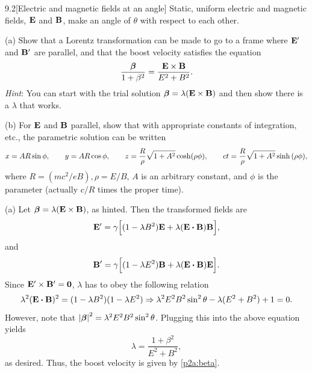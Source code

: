 \documentclass[12pt]{article}
\begin{document}
\begin{problem}{9.2}[Electric and magnetic fields at an angle]
Static, uniform electric and magnetic fields, $\vb{E}$ and $\vb{B}$, make an
angle of $\theta$ with respect to each other.

(a) Show that a Lorentz transformation can be made to go to a frame where
$\vb{E}'$ and $\vb{B}'$ are parallel, and that the boost velocity satisfies the
equation
\begin{equation}\label{p2a:beta}
    \frac{\bm\beta}{1+\beta^2}=\frac{\vb{E}\times\vb{B}}{E^2+B^2}. 
\end{equation}
\textit{Hint}: You can start with the trial solution
$\bm\beta=\lambda(\vb{E}\times\vb{B})$ and then show there is a $\lambda$ that
works.

(b) For $\vb{E}$ and $\vb{B}$ parallel, show that with appropriate constants of
integration, etc., the parametric solution can be written
\begin{equation}
    x=AR\sin\phi,\qquad
    y=AR\cos\phi,\qquad
    z=\frac{R}{\rho}\sqrt{1+A^2}\cosh(\rho\phi),\qquad
    ct=\frac{R}{\rho}\sqrt{1+A^2}\sinh\qty(\rho\phi),
\end{equation}
where $R=(mc^2/eB),\rho=E/B$, $A$ is an arbitrary constant, and $\phi$ is the
parameter (actually $c/R$ times the proper time).
\begin{solution}
(a) Let $\bm\beta=\lambda(\vb{E}\times\vb{B})$, as hinted. Then the transformed
fields are
\begin{equation}
    \vb{E}'=\gamma\qty[(1-\lambda
    B^2)\vb{E}+\lambda\qty(\vb{E}\vdot\vb{B})\vb{B}],
\end{equation}
and
\begin{equation}
    \vb{B}'=\gamma\qty[(1-\lambda
    E^2)\vb{B}+\lambda\qty(\vb{E}\vdot\vb{B})\vb{E}].
\end{equation}
Since $\vb{E}'\times\vb{B}'=\bm0$, $\lambda$ has to obey the following relation
\begin{equation}
    \lambda^2(\vb{E}\vdot\vb{B})^2=(1-\lambda B^2)(1-\lambda E^2) 
    \Rightarrow\lambda^2E^2B^2\sin^2\theta-\lambda(E^2+B^2)+1=0.
\end{equation}
However, note that $\abs{\bm\beta}^2=\lambda^2E^2B^2\sin^2\theta$. Plugging this
into the above equation yields
\begin{equation}
    \lambda=\frac{1+\beta^2}{E^2+B^2}, 
\end{equation}
as desired. Thus, the boost velocity is given by \eqref{p2a:beta}.


\end{solution}
\end{problem}
\end{document}
